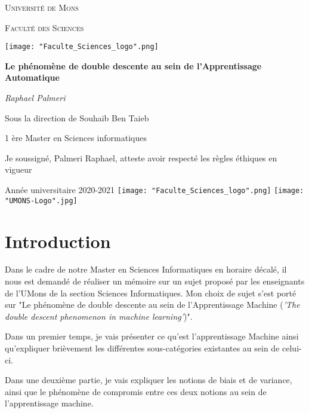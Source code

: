 \documentclass[a4paper]{article}
\author{Raphael Palmeri\\1 ère Master en Sciences Informatiques\\ 2020-2021}
\begin{document}
\begin{titlepage}
	\centering
	{\scshape\LARGE Université de Mons \par}
	\vspace{1cm}
	{\scshape\large Faculté des Sciences \par}
	\texttt{[image: "Faculte\_Sciences\_logo".png]}
	\vspace{1.5cm}
	{\huge\bfseries Le phénomène de double descente au sein de l'Apprentissage Automatique \par}
	\vspace{2cm}
	{\Large\itshape Raphael Palmeri \par}
	\vspace{2.0cm}
	{Sous la direction de Souhaib Ben Taieb \par}
	\vspace{1.0cm}
	{1 ère Master en Sciences informatiques \par}
	\vspace{0.5cm}
	{Je soussigné, Palmeri Raphael, atteste avoir respecté les règles éthiques en vigueur \par}
	\vspace{4cm}
	Année universitaire 2020-2021
	\vfill
	\texttt{[image: "Faculte\_Sciences\_logo".png]}
	\hfill
	\texttt{[image: "UMONS-Logo".jpg]}
\end{titlepage}
\newpage
\thispagestyle{empty}
\mbox{}
\newpage

\tableofcontents
\newpage

\section{Introduction}
Dans le cadre de notre Master en Sciences Informatiques en horaire décalé, il nous est demandé de réaliser un mémoire sur un sujet proposé par les enseignants de l'UMons de la section Sciences Informatiques. Mon choix de sujet s'est porté sur "Le phénomène de double descente au sein de l'Apprentissage Machine (\textit{'The double descent phenomenon in machine learning'})".\newline

Dans un premier temps, je vais présenter ce qu'est l'apprentissage Machine ainsi qu'expliquer brièvement les différentes sous-catégories existantes au sein de celui-ci. \newline

Dans une deuxième partie, je vais expliquer les notions de biais et de variance, ainsi que le phénomène de compromis entre ces deux notions au sein de l'apprentissage machine. \newline
\end{document}
